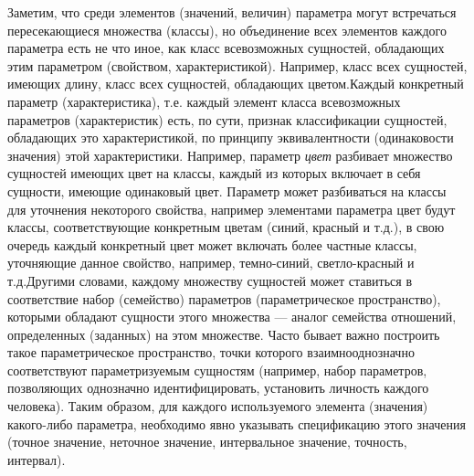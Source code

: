 \begin{SCn}
\begin{scnsubstruct}
{            Заметим, что среди элементов (значений, величин) параметра могут встречаться пересекающиеся множества (классы), но объединение всех элементов каждого параметра есть не что иное, как класс всевозможных сущностей, обладающих этим параметром (свойством, характеристикой). Например, класс всех сущностей, имеющих длину, класс всех сущностей, обладающих цветом.Каждый конкретный параметр (характеристика), т.е. каждый элемент класса всевозможных параметров (характеристик) есть, по сути, признак классификации сущностей, обладающих это характеристикой, по принципу эквивалентности (одинаковости значения) этой характеристики. Например, параметр \textit{цвет} разбивает множество сущностей имеющих цвет на классы, каждый из которых включает в себя сущности, имеющие одинаковый цвет. Параметр может разбиваться на классы для уточнения некоторого свойства, например элементами параметра цвет будут классы, соответствующие конкретным цветам (синий, красный и т.д.), в свою очередь каждый конкретный цвет может включать более частные классы, уточняющие данное свойство, например, темно-синий, светло-красный и т.д.Другими словами, каждому множеству сущностей может ставиться в соответствие набор (семейство) параметров (параметрическое пространство), которыми обладают сущности этого множества --- аналог семейства отношений, определенных (заданных) на этом множестве. Часто бывает важно построить такое параметрическое пространство, точки которого взаимнооднозначно соответствуют параметризуемым сущностям (например, набор параметров, позволяющих однозначно идентифицировать, установить личность каждого человека). Таким образом, для каждого используемого элемента (значения) какого-либо параметра, необходимо явно указывать спецификацию этого значения (точное значение, неточное значение, интервальное значение, точность, интервал).}
      
       
       

\end{scnsubstruct}
\end{SCn}
